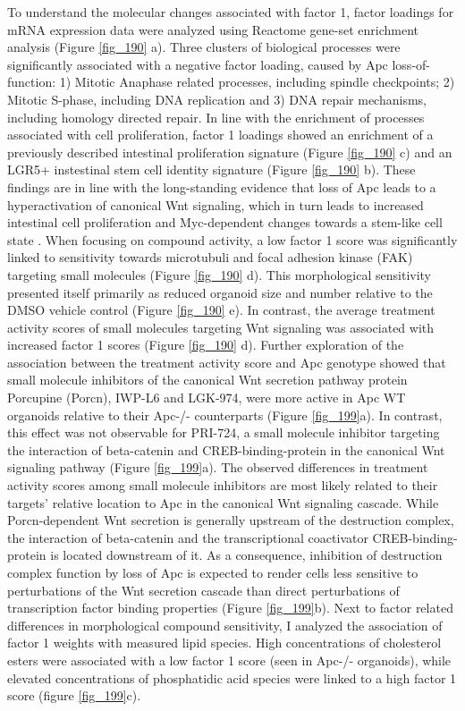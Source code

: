 \begin{flushleft}
To understand the molecular changes associated with factor 1, factor loadings for mRNA expression data were analyzed using Reactome gene-set enrichment analysis (Figure \ref{fig_190} a). Three clusters of biological processes were significantly associated with a negative factor loading, caused by Apc loss-of-function: 1) Mitotic Anaphase related processes, including spindle checkpoints; 2) Mitotic S-phase, including DNA replication and 3) DNA repair mechanisms, including homology directed repair. In line with the enrichment of processes associated with cell proliferation, factor 1 loadings showed an enrichment of a previously described intestinal proliferation signature (Figure \ref{fig_190} c) and an LGR5+ instestinal stem cell identity signature (Figure \ref{fig_190} b). These findings are in line with the long-standing evidence that loss of Apc leads to a hyperactivation of canonical Wnt signaling, which in turn leads to increased intestinal cell proliferation and Myc-dependent changes towards a stem-like cell state \cite{Sansom2007-wm, Satoh2017-nd}. When focusing on compound activity, a low factor 1 score was significantly linked to sensitivity towards microtubuli and focal adhesion kinase (FAK) targeting small molecules (Figure \ref{fig_190} d). This morphological sensitivity presented itself primarily as reduced organoid size and number relative to the DMSO vehicle control (Figure \ref{fig_190} e). In contrast, the average treatment activity scores of small molecules targeting Wnt signaling was associated with increased factor 1 scores (Figure \ref{fig_190} d). Further exploration of the association between the treatment activity score and Apc genotype showed that small molecule inhibitors of the canonical Wnt secretion pathway protein Porcupine (Porcn), IWP-L6 and LGK-974, were more active in Apc WT organoids relative to their Apc-/- counterparts \cite{Liu2013-dh} (Figure \ref{fig_199}a). In contrast, this effect was not observable for PRI-724, a small molecule inhibitor targeting the interaction of beta-catenin and CREB-binding-protein in the canonical Wnt signaling pathway \cite{Okazaki2019-gy} (Figure \ref{fig_199}a). The observed differences in treatment activity scores among small molecule inhibitors are most likely related to their targets' relative location to Apc in the canonical Wnt signaling cascade. While Porcn-dependent Wnt secretion is generally upstream of the destruction complex, the interaction of beta-catenin and the transcriptional coactivator CREB-binding-protein is located downstream of it. As a consequence, inhibition of destruction complex function by loss of Apc is expected to render cells less sensitive to perturbations of the Wnt secretion cascade than direct perturbations of transcription factor binding properties (Figure \ref{fig_199}b). Next to factor related differences in morphological compound sensitivity, I analyzed the association of factor 1 weights with measured lipid species. High concentrations of cholesterol esters were associated with a low factor 1 score (seen in Apc-/- organoids), while elevated concentrations of phosphatidic acid species were linked to a high factor 1 score (figure \ref{fig_199}c).


\end{flushleft}
